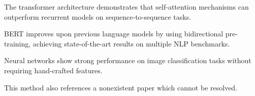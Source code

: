 \documentclass{article}
\begin{document}
The transformer architecture \cite{vaswani2017attention} demonstrates that self-attention
mechanisms can outperform recurrent models on sequence-to-sequence tasks.

BERT \cite{devlin2018bert} improves upon previous language models by using bidirectional
pre-training, achieving state-of-the-art results on multiple NLP benchmarks.

Neural networks show strong performance on image classification tasks without requiring
hand-crafted features.

This method also references a nonexistent paper \cite{broken2099} which cannot be resolved.
\end{document}
